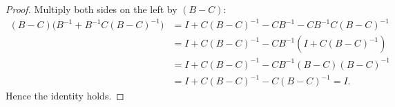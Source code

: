\begin{proof}
Multiply both sides on the left by $(B - C)$:
\begin{align}
(B - C) \bigl(B^{-1} + B^{-1} C (B-C)^{-1}\bigr)
&= I + C(B-C)^{-1} - C B^{-1} - C B^{-1} C (B-C)^{-1} \\
&= I + C(B-C)^{-1} - C B^{-1}(I + C(B-C)^{-1}) \\
&= I + C(B-C)^{-1} - C B^{-1}(B-C)(B-C)^{-1} \\
&= I + C(B-C)^{-1} - C(B-C)^{-1} = I.
\end{align}
Hence the identity holds.
\end{proof}

